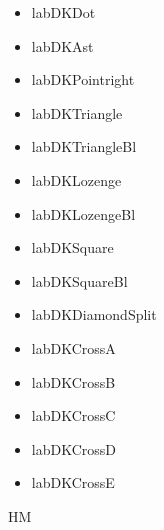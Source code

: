 \documentclass[a4paper]{article}%
\begin{document}
\begin{itemize}[labDKDot]
\item%
    labDKDot
\end{itemize}
\begin{itemize}[labDKAst]
\item%
    labDKAst
\end{itemize}
\begin{itemize}[labDKPointright]
\item%
    labDKPointright
\end{itemize}
\begin{itemize}[labDKTriangle]
\item%
    labDKTriangle
\end{itemize}
\begin{itemize}[labDKTriangleBl]
\item%
    labDKTriangleBl
\end{itemize}
\begin{itemize}[labDKLozenge]
\item%
    labDKLozenge
\end{itemize}
\begin{itemize}[labDKLozengeBl]
\item%
    labDKLozengeBl
\end{itemize}
\begin{itemize}[labDKSquare]
\item%
    labDKSquare
\end{itemize}
\begin{itemize}[labDKSquareBl]
\item%
    labDKSquareBl
\end{itemize}
\begin{itemize}[labDKDiamondSplit]
\item%
    labDKDiamondSplit
\end{itemize}
\begin{itemize}[labDKCrossA]
\item%
    labDKCrossA
\end{itemize}
\begin{itemize}[labDKCrossB]
\item%
    labDKCrossB
\end{itemize}
\begin{itemize}[labDKCrossC]
\item%
    labDKCrossC
\end{itemize}
\begin{itemize}[labDKCrossD]
\item%
    labDKCrossD
\end{itemize}
\begin{itemize}[labDKCrossE]
\item%
    labDKCrossE
\end{itemize}
HM
\end{document}
